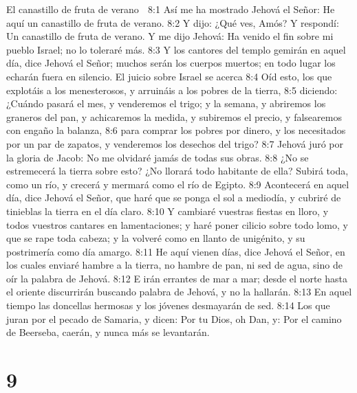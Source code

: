 El canastillo de fruta de verano  

8:1 Así me ha mostrado Jehová el Señor: He aquí un canastillo de fruta de verano.  
8:2 Y dijo: ¿Qué ves, Amós? Y respondí: Un canastillo de fruta de verano. Y me dijo Jehová: Ha venido el fin sobre mi pueblo Israel; no lo toleraré más.  
8:3 Y los cantores del templo gemirán en aquel día, dice Jehová el Señor; muchos serán los cuerpos muertos; en todo lugar los echarán fuera en silencio.  
El juicio sobre Israel se acerca  
8:4 Oíd esto, los que explotáis a los menesterosos, y arruináis a los pobres de la tierra,  
8:5 diciendo: ¿Cuándo pasará el mes, y venderemos el trigo; y la semana, y abriremos los graneros del pan, y achicaremos la medida, y subiremos el precio, y falsearemos con engaño la balanza,  
8:6 para comprar los pobres por dinero, y los necesitados por un par de zapatos, y venderemos los desechos del trigo?  
8:7 Jehová juró por la gloria de Jacob: No me olvidaré jamás de todas sus obras.  
8:8 ¿No se estremecerá la tierra sobre esto? ¿No llorará todo habitante de ella? Subirá toda, como un río, y crecerá y mermará como el río de Egipto.  
8:9 Acontecerá en aquel día, dice Jehová el Señor, que haré que se ponga el sol a mediodía, y cubriré de tinieblas la tierra en el día claro.  
8:10 Y cambiaré vuestras fiestas en lloro, y todos vuestros cantares en lamentaciones; y haré poner cilicio sobre todo lomo, y que se rape toda cabeza; y la volveré como en llanto de unigénito, y su postrimería como día amargo.  
8:11 He aquí vienen días, dice Jehová el Señor, en los cuales enviaré hambre a la tierra, no hambre de pan, ni sed de agua, sino de oír la palabra de Jehová.  
8:12 E irán errantes de mar a mar; desde el norte hasta el oriente discurrirán buscando palabra de Jehová, y no la hallarán.  
8:13 En aquel tiempo las doncellas hermosas y los jóvenes desmayarán de sed.  
8:14 Los que juran por el pecado de Samaria, y dicen: Por tu Dios, oh Dan, y: Por el camino de Beerseba, caerán, y nunca más se levantarán.  

\chapter{9}

